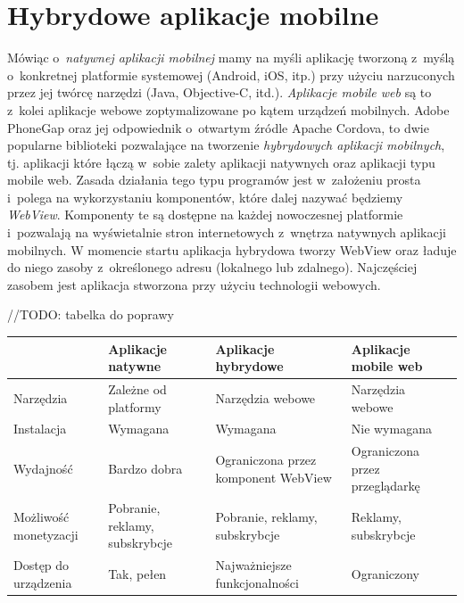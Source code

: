\documentclass[brudnopis]{xmgr}
\begin{document}
\section{Hybrydowe aplikacje mobilne}
Mówiąc o~\textit{natywnej aplikacji mobilnej} mamy na myśli aplikację tworzoną z~myślą o~konkretnej platformie systemowej (Android, iOS, itp.) przy użyciu narzuconych przez jej twórcę narzędzi (Java, Objective-C, itd.).  \textit{Aplikacje mobile web} są to z~kolei aplikacje webowe zoptymalizowane po kątem urządzeń mobilnych.
Adobe PhoneGap oraz jej odpowiednik o~otwartym źródle Apache Cordova, to
dwie popularne biblioteki pozwalające na tworzenie \textit{hybrydowych aplikacji
mobilnych}, tj. aplikacji które łączą w~sobie zalety aplikacji natywnych oraz aplikacji
typu mobile web. Zasada działania tego typu programów jest w~założeniu prosta i~polega na wykorzystaniu komponentów, które dalej nazywać będziemy \textit{WebView}.
Komponenty te są dostępne na każdej nowoczesnej platformie i~pozwalają na
wyświetalnie stron internetowych z~wnętrza natywnych aplikacji mobilnych. 
W momencie startu aplikacja hybrydowa tworzy WebView oraz ładuje do niego zasoby z~określonego adresu (lokalnego lub zdalnego). Najczęściej zasobem jest aplikacja stworzona przy użyciu technologii webowych.     

//TODO: tabelka do poprawy
\begin{center}
    \begin{tabularx}{\textwidth}{ | X | X | X | X |}
    \hline
   			& Aplikacje natywne        & Aplikacje hybrydowe 	& Aplikacje mobile web 			\\ \hline
    Narzędzia	& Zależne od platformy	&   Narzędzia webowe	& 	Narzędzia webowe			\\ \hline
    Instalacja	&        Wymagana               &	 Wymagana         	& 		Nie wymagana		\\ \hline
    Wydajność	& 	Bardzo dobra		&Ograniczona przez komponent WebView&Ograniczona przez przeglądarkę\\ \hline
    Możliwość monetyzacji
    			&  Pobranie, reklamy, subskrybcje  & Pobranie, reklamy, subskrybcje & Reklamy, subskrybcje \\ \hline
    Dostęp do urządzenia
    			& 	Tak, pełen  	         &Najważniejsze funkcjonalności& Ograniczony        \\ \hline
    \end{tabularx}
\end{center}
\end{document}
